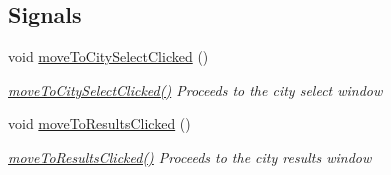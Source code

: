 \subsection*{Signals}
\begin{DoxyCompactItemize}
\item 
void \mbox{\hyperlink{class_food_select_window_a0d2bb2f7e07f62e62c2920d989415d8c}{move\+To\+City\+Select\+Clicked}} ()
\begin{DoxyCompactList}\small\item\em \mbox{\hyperlink{class_food_select_window_a0d2bb2f7e07f62e62c2920d989415d8c}{move\+To\+City\+Select\+Clicked()}} Proceeds to the city select window \end{DoxyCompactList}\item 
void \mbox{\hyperlink{class_food_select_window_a76b0dfec8f72dfa4c336732a922287fc}{move\+To\+Results\+Clicked}} ()
\begin{DoxyCompactList}\small\item\em \mbox{\hyperlink{class_food_select_window_a76b0dfec8f72dfa4c336732a922287fc}{move\+To\+Results\+Clicked()}} Proceeds to the city results window \end{DoxyCompactList}\end{DoxyCompactItemize}
